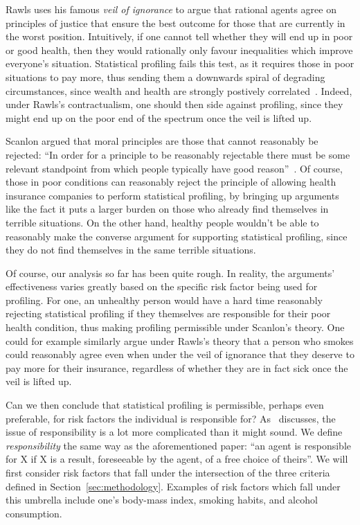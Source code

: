 Rawls uses his famous \emph{veil of ignorance} to argue that rational agents agree on principles of justice that ensure the best outcome for those that are currently in the worst position. Intuitively, if one cannot tell whether they will end up in poor or good health, then they would rationally only favour inequalities which improve everyone's situation. Statistical profiling fails this test, as it requires those in poor situations to pay more, thus sending them a downwards spiral of degrading circumstances, since wealth and health are strongly postively correlated~\cite{health-socdec}. Indeed, under Rawls's contractualism, one should then side against profiling, since they might end up on the poor end of the spectrum once the veil is lifted up.

Scanlon argued that moral principles are those that cannot reasonably be rejected: ``In order for a principle to be reasonably rejectable there must be some relevant standpoint from which people typically have good reason''~\cite[Page~218]{what-we-owe}. Of course, those in poor conditions can reasonably reject the principle of allowing health insurance companies to perform statistical profiling, by bringing up arguments like the fact it puts a larger burden on those who already find themselves in terrible situations. On the other hand, healthy people wouldn't be able to reasonably make the converse argument for supporting statistical profiling, since they do not find themselves in the same terrible situations.

Of course, our analysis so far has been quite rough. In reality, the arguments' effectiveness varies greatly based on the specific risk factor being used for profiling. For one, an unhealthy person would have a hard time reasonably rejecting statistical profiling if they themselves are responsible for their poor health condition, thus making profiling permissible under Scanlon's theory. One could for example similarly argue under Rawls's theory that a person who smokes could reasonably agree even when under the veil of ignorance that they deserve to pay more for their insurance, regardless of whether they are in fact sick once the veil is lifted up.

Can we then conclude that statistical profiling is permissible, perhaps even preferable, for risk factors the individual is responsible for? As~\cite[Section~3]{odihi20} discusses, the issue of responsibility is a lot more complicated than it might sound. We define \emph{responsibility} the same way as the aforementioned paper: ``an agent is responsible for X if X is a result, foreseeable by the agent, of a free choice of theirs''. We will first consider risk factors that fall under the intersection of the three criteria defined in Section~\ref{sec:methodology}. Examples of risk factors which fall under this umbrella include one's body-mass index, smoking habits, and alcohol consumption.


